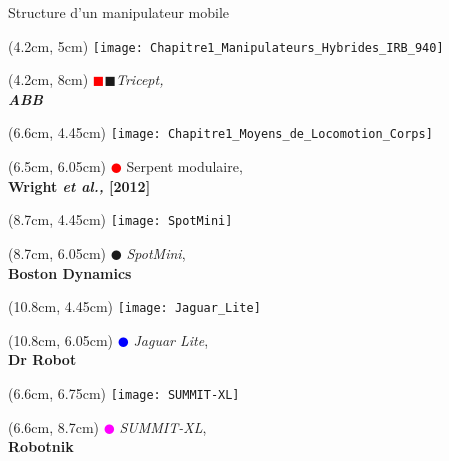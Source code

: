 \documentclass[french]{beamer}
\begin{document}
\begin{frame}{Structure d'un manipulateur mobile}
\begin{textblock*}{2cm}(4.2cm, 5cm)
\texttt{[image: Chapitre1\_Manipulateurs\_Hybrides\_IRB\_940]}
\end{textblock*}
\begin{textblock*}{2cm}(4.2cm, 8cm)
\centering
\tiny{\textcolor{red}{$\blacksquare$}\textcolor{vert}{$\blacksquare$}\textit{Tricept,\\ \textbf{ABB}}}\\
\end{textblock*}


\begin{textblock*}{2cm}(6.6cm, 4.45cm)
\texttt{[image: Chapitre1\_Moyens\_de\_Locomotion\_Corps]}
\end{textblock*}
\begin{textblock*}{2.1cm}(6.5cm, 6.05cm)
\centering
\tiny{\textcolor{red}{$\CIRCLE$}  Serpent modulaire, \\ \textbf{Wright \textit{et al.,} [2012]}}
\end{textblock*}

\begin{textblock*}{2cm}(8.7cm, 4.45cm)
\texttt{[image: SpotMini]}
\end{textblock*}
\begin{textblock*}{2cm}(8.7cm, 6.05cm)
\centering
\tiny{\textcolor{vert}{$\CIRCLE$}  \textit{SpotMini},\\ \textbf{Boston Dynamics}}
\end{textblock*}

\begin{textblock*}{2cm}(10.8cm, 4.45cm)
\texttt{[image: Jaguar\_Lite]}
\end{textblock*}
\begin{textblock*}{2cm}(10.8cm, 6.05cm)
\centering
\tiny{\textcolor{blue}{$\CIRCLE$}  \textit{Jaguar Lite},\\ \textbf{Dr Robot}}\\
\end{textblock*}

\begin{textblock*}{3cm}(6.6cm, 6.75cm)
\centering
\texttt{[image: SUMMIT-XL]}
\end{textblock*}
\begin{textblock*}{3cm}(6.6cm, 8.7cm)
\centering
\tiny{\textcolor{magenta}{$\CIRCLE$}  \textit{SUMMIT-XL},\\ \textbf{Robotnik}}\\
\end{textblock*}


\end{frame}
\end{document}
